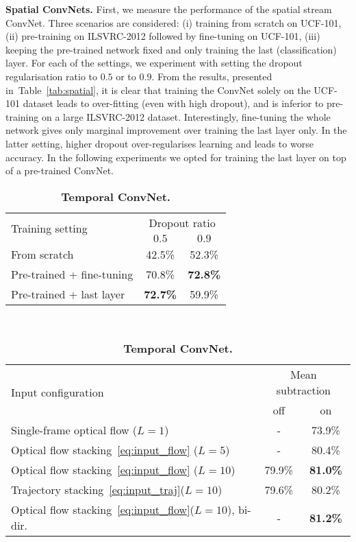\documentclass{article} \usepackage{nips14submit_e,times}
\newcommand{\tblref}[1]{Table~\ref{#1}}
\begin{document}
\noindent\textbf{Spatial ConvNets.}
First, we measure the performance of the spatial stream ConvNet.
Three scenarios are considered:
(i) training from scratch on UCF-101, 
(ii) pre-training on ILSVRC-2012 followed by fine-tuning on UCF-101, 
(iii) keeping the pre-trained network fixed and only training the last (classification) layer.  
For each of the settings, we experiment with setting the dropout
regularisation ratio to $0.5$ or to $0.9$.  
From the results,
presented in~\tblref{tab:spatial}, it is clear that training the
ConvNet solely on the UCF-101 dataset leads to over-fitting (even with
high dropout), and is inferior to pre-training on a large ILSVRC-2012
dataset. Interestingly, fine-tuning the whole network gives only
marginal improvement over training the last layer only.
In the latter setting, higher dropout over-regularises learning and leads to worse accuracy. 
In the following experiments we opted for training the last layer on top of a pre-trained ConvNet.
\begin{table}[ht]
\setlength{\tabcolsep}{4pt}
\small
\caption{\textbf{Individual ConvNets accuracy on UCF-101 (split 1).}}
\begin{subtable}{.4\textwidth}
\vspace{-2em}
\centering
\caption{\textbf{Spatial ConvNet.}}
\begin{tabular}{|l|c|c|} \hline
\multirow{2}{*}{Training setting} & \multicolumn{2}{c|}{Dropout ratio} \\ \cline{2-3}
 & $0.5$ & $0.9$  \\ \hline
From scratch & 42.5\%  & 52.3\% \\ \hline
Pre-trained + fine-tuning & 70.8\%  & \textbf{72.8\%}  \\ \hline
Pre-trained + last layer & \textbf{72.7\%} & 59.9\%  \\ \hline
\end{tabular}
\label{tab:spatial}
\end{subtable}
~~~
\begin{subtable}{.6\textwidth}
\centering
\caption{\textbf{Temporal ConvNet.}}
\begin{tabular}{|l|c|c|} \hline
\multirow{2}{*}{Input configuration} & \multicolumn{2}{c|}{Mean subtraction} \\ \cline{2-3}
 & off & on  \\ \hline
Single-frame optical flow ($L=1$) & - & 73.9\% \\ \hline
Optical flow stacking~\eqref{eq:input_flow} ($L=5$) & - & 80.4\% \\ \hline
Optical flow stacking~\eqref{eq:input_flow} ($L=10$) & 79.9\% & \textbf{81.0\%} \\ \hline
Trajectory stacking~\eqref{eq:input_traj}($L=10$) & 79.6\% & 80.2\% \\ \hline
Optical flow stacking~\eqref{eq:input_flow}($L=10$), bi-dir.  & - & \textbf{81.2\%} \\ \hline
\end{tabular}
\label{tab:temporal}
\end{subtable}
\end{table}
\end{document}
